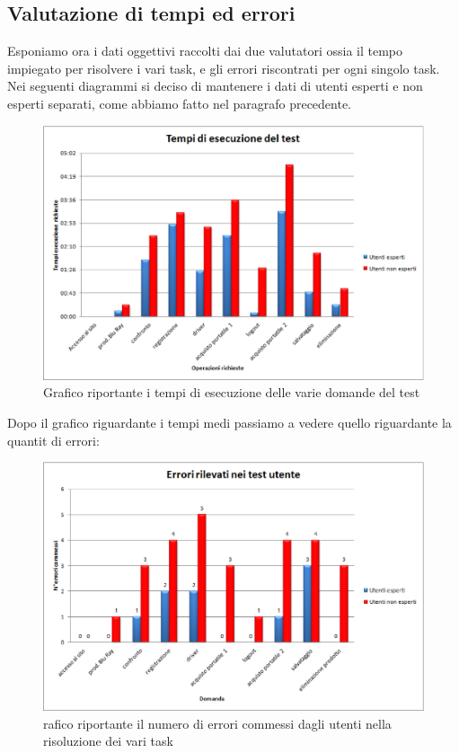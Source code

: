\subsection*{Valutazione di tempi ed errori}
Esponiamo ora i dati oggettivi raccolti dai due valutatori ossia il tempo impiegato per risolvere i vari task, e gli errori riscontrati per ogni singolo task. Nei seguenti diagrammi si  deciso di mantenere i dati di utenti esperti e non esperti separati, come abbiamo fatto nel paragrafo precedente.


\begin{figure}[!h]
\centering
\includegraphics[angle=90, scale=0.75]{figure/grafico_tempi_esecuzione.eps}
\caption{Grafico riportante i tempi di esecuzione delle varie domande del test}
\label{fig:tempi_esecuzione_test}
\end{figure}

Dopo il grafico riguardante i tempi medi passiamo a vedere quello riguardante la quantit di errori:

\begin{figure}[!h]
\centering
\includegraphics[angle=90, scale=0.75]{figure/grafico_errori_test_utente.eps}
\caption{rafico riportante il numero di errori commessi dagli utenti nella risoluzione dei vari task}
\label{fig:errori_test}
\end{figure}


